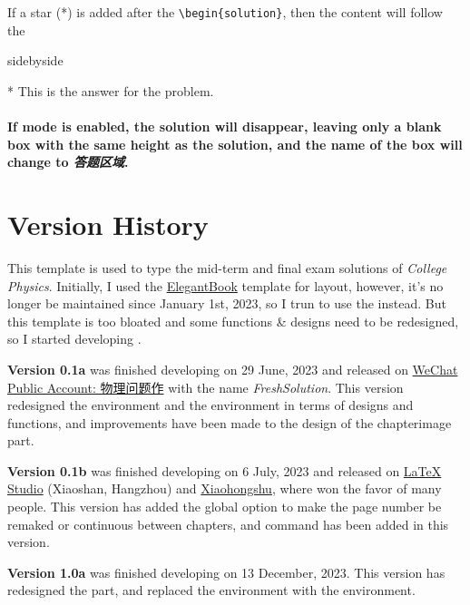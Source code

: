 If a star (*) is added after the \verb|\begin{solution}|, then the content will follow the 
\begin{tcblisting}{sidebyside}
\begin{solution}*
    This is the answer for the problem.
\end{solution}
\end{tcblisting}

\paragraph{If mode  is enabled, the solution will disappear, leaving only a blank box with the same height as the solution, and the name of the box will change to \emph{\textcolor{1号色}{\textbf{ 答题区域}}}.}

\newpage
\section{Version History}
This template is used to type the mid-term and final exam solutions of \emph{College Physics}. Initially, I used the \href{https://www.ctan.org/pkg/elegantbook}{ElegantBook} template for layout, however, it's no longer be maintained since January 1st, 2023, so I trun to use the \href{https://github.com/Azure1210/VividBooK}{} instead. But this template is too bloated and some functions \& designs need to be redesigned, so I started developing .

\textsf{\bfseries Version 0.1a} was finished developing on 29 June, 2023 and released on \href{https://mp.weixin.qq.com/s/kd4StYk3XybhNQZkAfoY6A}{ WeChat Public Account: 物理问题作} with the name \emph{FreshSolution}. This version redesigned the  environment and the  environment in terms of designs and functions, and improvements have been made to the design of the chapterimage part.

\textsf{\bfseries Version 0.1b} was finished developing on 6 July, 2023 and released on \href{https://www.latexstudio.net/index/details/index/mid/3553.html}{LaTeX Studio} (Xiaoshan, Hangzhou) and \href{http://xhslink.com/YBuuuw}{Xiaohongshu}, where won the favor of many people. This version has added the global option to make the page number be remaked or continuous between chapters, and command  has been added in this version.

\textsf{\bfseries Version 1.0a} was finished developing on 13 December, 2023. This version has redesigned the  part,  and replaced the  environment with the  environment.

